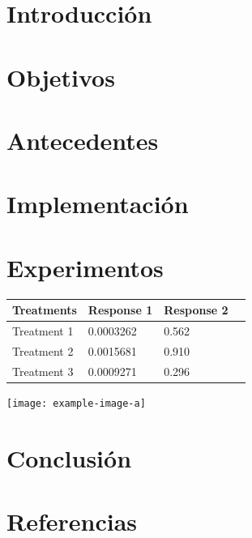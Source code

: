 \documentclass[a0,portrait]{a0poster}
\begin{document}
\begin{multicols}{2}
\begin{abstract}
    \blindtext[1]        
\end{abstract}

\section*{Introducción}
\blindtext[1]

\section*{Objetivos}
\blindtext[1]

\section*{Antecedentes}
\blindtext[1]

\section*{Implementación}
\blindtext[1]

\section*{Experimentos}
\blindtext[1]
%

\begin{center}\vspace{1cm}
    \begin{tabular}{l l l l}
    \toprule
    \textbf{Treatments} & \textbf{Response 1} & \textbf{Response 2} \\
    \midrule
    Treatment 1 & 0.0003262 & 0.562 \\
    Treatment 2 & 0.0015681 & 0.910 \\
    Treatment 3 & 0.0009271 & 0.296 \\
    \bottomrule
    \end{tabular}
\end{center}\vspace{1cm}

\begin{center}\vspace{1cm}
    \texttt{[image: example-image-a]}
\end{center}


\section*{Conclusión}
\blindtext[1]


\section*{Referencias}

\nocite{beijing2020Suggested,boni2002epidemiology}

\renewcommand\refname{\vskip -1cm}




\end{multicols}
\end{document}
